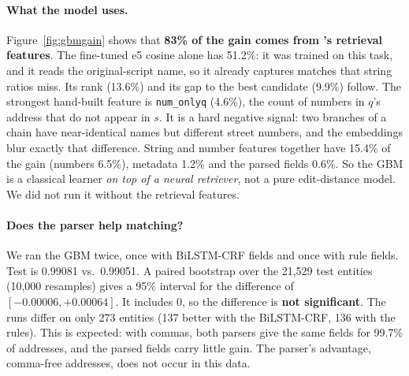 \paragraph{What the model uses.} Figure~\ref{fig:gbmgain} shows that \textbf{83\% of the gain comes from
's retrieval features}. The fine-tuned e5 cosine alone has 51.2\%: it was trained on this task, and it
reads the original-script name, so it already captures matches that string ratios miss. Its rank (13.6\%)
and its gap to the best candidate (9.9\%) follow. The strongest hand-built feature is \texttt{num\_onlyq}
(4.6\%), the count of numbers in $q$'s address that do not appear in $s$. It is a hard negative signal: two
branches of a chain have near-identical names but different street numbers, and the embeddings blur exactly
that difference. String and number features together have 15.4\% of the gain (numbers 6.5\%), metadata
1.2\% and the parsed fields 0.6\%. So the GBM is a classical learner \emph{on top of a neural retriever}, not
a pure edit-distance model. We did not run it without the retrieval features.

\paragraph{Does the parser help matching?} We ran the GBM twice, once with BiLSTM-CRF fields and once with
rule fields. Test \fhalf{} is 0.99081 vs.\ 0.99051. A paired bootstrap over the 21,529 test
entities (10,000 resamples) gives a 95\% interval for the difference of
$[-0.00006, +0.00064]$. It includes 0, so the difference is \textbf{not significant}. The runs differ on only
273 entities (137 better with the BiLSTM-CRF, 136 with the rules). This is expected: with commas, both
parsers give the same fields for 99.7\% of addresses, and the parsed fields carry little gain. The parser's
advantage, comma-free addresses, does not occur in this data.
